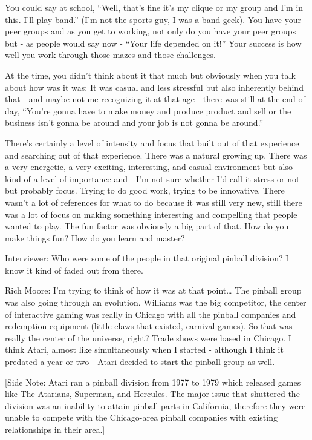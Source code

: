 You could say at school, “Well, that's fine it's my clique or my group and I'm in this. I'll play band.” (I’m not the sports guy, I was a band geek). You have your peer groups and as you get to working, not only do you have your peer groups but - as people would say now - “Your life depended on it!” Your success is how well you work through those mazes and those challenges. 

At the time, you didn't think about it that much but obviously when you talk about how was it was: It was casual and less stressful but also inherently behind that - and maybe not me recognizing it at that age - there was still at the end of day, “You're gonna have to make money and produce product and sell or the business isn't gonna be around and your job is not gonna be around.”

There's certainly a level of intensity and focus that built out of that experience and searching out of that experience. There was a natural growing up. There was a very energetic, a very exciting, interesting, and casual environment but also kind of a level of importance and - I’m not sure whether I’d call it stress or not - but probably focus. Trying to do good work, trying to be innovative. There wasn’t a lot of references for what to do because it was still very new, still there was a lot of focus on making something interesting and compelling that people wanted to play. The fun factor was obviously a big part of that. How do you make things fun? How do you learn and master?

\textcolor{interviewer}{Interviewer:} Who were some of the people in that original pinball division? I know it kind of faded out from there.

\textcolor{interviewee}{Rich Moore:} I’m trying to think of how it was at that point… The pinball group was also going through an evolution. Williams was the big competitor, the center of interactive gaming was really in Chicago with all the pinball companies and redemption equipment (little claws that existed, carnival games). So that was really the center of the universe, right? Trade shows were based in Chicago. I think Atari, almost like simultaneously when I started - although I think it predated a year or two - Atari decided to start the pinball group as well. 

[Side Note: Atari ran a pinball division from 1977 to 1979 which released games like The Atarians, Superman, and Hercules. The major issue that shuttered the division was an inability to attain pinball parts in California, therefore they were unable to compete with the Chicago-area pinball companies with existing relationships in their area.]


